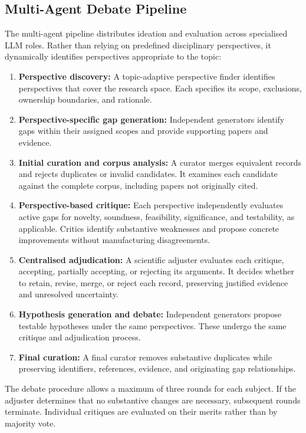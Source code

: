 \documentclass[sigconf,review,anonymous=false]{acmart}
\begin{document}
\subsection{Multi-Agent Debate Pipeline}
The multi-agent pipeline distributes ideation and evaluation across specialised LLM roles. Rather than relying on predefined disciplinary perspectives, it dynamically identifies perspectives appropriate to the topic:
\begin{enumerate}[leftmargin=*]
  \item \textbf{Perspective discovery:} A topic-adaptive perspective finder identifies perspectives that cover the research space. Each specifies its scope, exclusions, ownership boundaries, and rationale.
  \item \textbf{Perspective-specific gap generation:} Independent generators identify gaps within their assigned scopes and provide supporting papers and evidence.
  \item \textbf{Initial curation and corpus analysis:} A curator merges equivalent records and rejects duplicates or invalid candidates. It examines each candidate against the complete corpus, including papers not originally cited.
  \item \textbf{Perspective-based critique:} Each perspective independently evaluates active gaps for novelty, soundness, feasibility, significance, and testability, as applicable. Critics identify substantive weaknesses and propose concrete improvements without manufacturing disagreements.
  \item \textbf{Centralised adjudication:} A scientific adjuster evaluates each critique, accepting, partially accepting, or rejecting its arguments. It decides whether to retain, revise, merge, or reject each record, preserving justified evidence and unresolved uncertainty.
  \item \textbf{Hypothesis generation and debate:} Independent generators propose testable hypotheses under the same perspectives. These undergo the same critique and adjudication process.
  \item \textbf{Final curation:} A final curator removes substantive duplicates while preserving identifiers, references, evidence, and originating gap relationships.
\end{enumerate}
The debate procedure allows a maximum of three rounds for each subject. If the adjuster determines that no substantive changes are necessary, subsequent rounds terminate. Individual critiques are evaluated on their merits rather than by majority vote.
\end{document}
